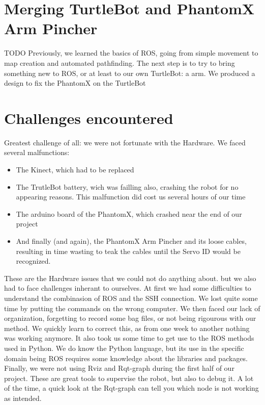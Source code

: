 \documentclass[aps,letterpaper,11pt]{revtex4}
\begin{document}
\section{Merging TurtleBot and PhantomX Arm Pincher}

TODO
Previously, we learned the basics of ROS, going from simple movement to map creation and automated pathfinding. The next step is to try to bring something new to ROS, or at least to our own TurtleBot: a arm.
We produced a design to fix the PhantomX on the TurtleBot

\section{Challenges encountered}
Greatest challenge of all: we were not fortunate with the Hardware. We faced several malfunctions: 

\begin{itemize}
  \item The Kinect, which had to be replaced
  \item The TrutleBot battery, wich was failling also, crashing the robot for no appearing reasons. This malfunction did cost us several hours of our time
  \item The arduino board of the PhantomX, which crashed near the end of our project
  \item And finally (and again), the PhantomX Arm Pincher and its loose cables, resulting in time wasting to teak the cables until the Servo ID would be recognized.
\end{itemize}

These are the Hardware issues that we could not do anything about. but we also had to face challenges inherant to ourselves.
At first we had some difficulties to understand the combinasion of ROS and the SSH connection. We lost quite some time by putting the commands on the wrong computer. We then faced our lack of organization, forgetting to record some bag files, or not being rigourous with our method. We quickly learn to correct this, as from one week to another nothing was working anymore. 
It also took us some time to get use to the ROS methods used in Python. We do know the Python language, but its use in the specific domain being ROS requires some knowledge about the libraries and packages.
Finally, we were not using Rviz and Rqt-graph during the first half of our project. These are great tools to supervise the robot, but also to debug it. A lot of the time, a quick look at the Rqt-graph can tell you which node is not working as intended.
\end{document}
